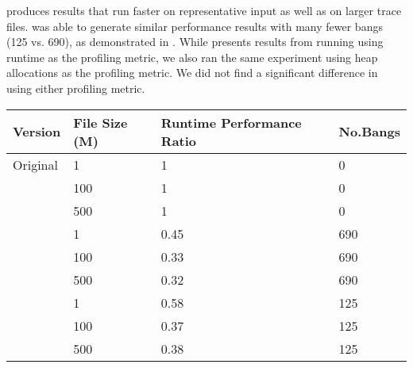 \Ao{} produces results that run
faster on representative input as well as on larger trace files.
\At{} was able to generate similar performance results with many fewer
bangs (125 vs. 690), as demonstrated in . 
While  presents results from running \At{} using runtime
as the profiling metric, we also ran the same experiment using heap
allocations as the profiling metric. We did not find a significant
difference in using either profiling metric.

\begin{table}
\centering

\begin{tabular}{p{3cm}p{3cm}p{5cm}p{1.5cm}}
\hline
Version   & File Size (M) & Runtime Performance Ratio& No.Bangs \\
\hline
Original      & 1       & 1         & 0   \\
              & 100     & 1         & 0 \\
              & 500     & 1         & 0 \\
\Ao{}         & 1       & 0.45      &  690\\
              & 100     & 0.33      &  690\\
              & 500     & 0.32      & 690\\
\At{}         & 1       &  0.58     & 125    \\
              & 100     & 0.37      & 125      \\
              & 500     & 0.38      & 125    \\

\hline
\end{tabular}
\label{tab:gc}
\end{table}
